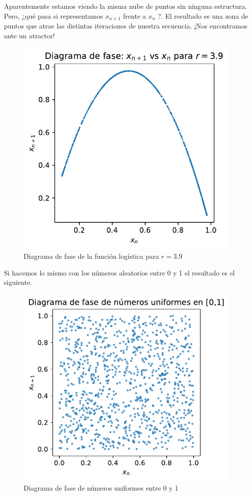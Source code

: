 \documentclass[
  10pt,
  a4paper,
  DIV=11,
  numbers=noendperiod,
  open=any]{scrreprt}
\numberwithin{equation}{chapter}
\numberwithin{equation}{section}
\renewcommand{\[}{\begin{equation}}
\renewcommand{\]}{\end{equation}}
\begin{document}
Aparentemente estamos viendo la misma nube de puntos sin ninguna
estructura. Pero, ¿qué pasa si representamos \(x_{n+1}\) frente a
\(x_n\) ?. El resultado es una zona de puntos que atrae las distintas
iteraciones de nuestra secuencia. ¡Nos encontramos ante un atractor!

\begin{figure}[h]
  \centering
  \includegraphics[width=0.99\textwidth]{04-clima/atractor_files/figure-pdf/cell-4-output-1.pdf}
  \caption{Diagrama de fase de la función logística para $r=3.9$}
\end{figure}


Si hacemos lo mismo con los números aleatorios entre 0 y 1 el resultado
es el siguiente.

\begin{figure}[h]
  \centering
  \includegraphics[width=0.99\textwidth]{04-clima/atractor_files/figure-pdf/cell-5-output-1.pdf}
  \caption{Diagrama de fase de números uniformes entre 0 y 1}
\end{figure}
\end{document}
